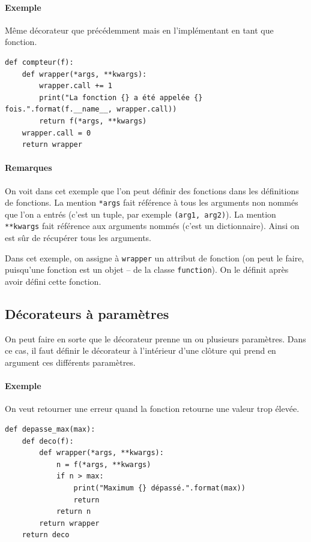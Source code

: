 \documentclass[a4paper, 10pt]{article}
\newcommand{\code}[1]{{\small\texttt{#1}}}
\begin{document}
\paragraph{Exemple} Même décorateur que précédemment mais en l'implémentant en tant que fonction.
\begin{verbatim}
def compteur(f):
    def wrapper(*args, **kwargs):
        wrapper.call += 1
        print("La fonction {} a été appelée {} fois.".format(f.__name__, wrapper.call))
        return f(*args, **kwargs)
    wrapper.call = 0
    return wrapper
\end{verbatim}
\paragraph{Remarques} On voit dans cet exemple que l'on peut définir des fonctions dans les définitions de fonctions. La mention \code{*args} fait référence à tous les arguments non nommés que l'on a entrés (c'est un tuple, par exemple \code{(arg1, arg2)}). La mention \code{**kwargs} fait référence aux arguments nommés (c'est un dictionnaire). Ainsi on est sûr de récupérer tous les arguments.\bigskip

Dans cet exemple, on assigne à \code{wrapper} un attribut de fonction (on peut le faire, puisqu'une fonction est un objet -- de la classe \code{function}). On le définit après avoir défini cette fonction.

\subsection{Décorateurs à paramètres}
On peut faire en sorte que le décorateur prenne un ou plusieurs paramètres. Dans ce cas, il faut définir le décorateur à l'intérieur d'une clôture qui prend en argument ces différents paramètres.

\paragraph{Exemple} On veut retourner une erreur quand la fonction retourne une valeur trop élevée.
\begin{verbatim}
def depasse_max(max):
    def deco(f):
        def wrapper(*args, **kwargs):
            n = f(*args, **kwargs)
            if n > max:
                print("Maximum {} dépassé.".format(max))
                return
            return n
        return wrapper
    return deco
\end{verbatim}
\end{document}
